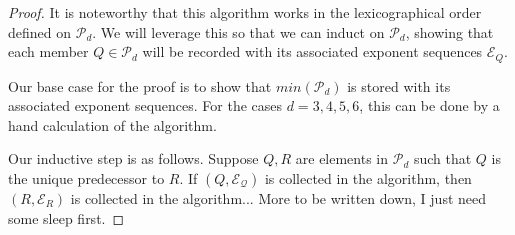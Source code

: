 \documentclass[../paper.tex]{subfiles}
\begin{document}
\noindent{}

\noindent{}

\begin{proof}
It is noteworthy that this algorithm works in the lexicographical
order defined on $\mathcal{P}_d$. We will leverage this so that we
can induct on $\mathcal{P}_d$, showing that each member $Q \in 
\mathcal{P}_d$ will be recorded with its associated exponent 
sequences $\mathcal{E}_Q$.

Our base case for the proof is to show that $min(\mathcal{P}_d)$
is stored with its associated exponent sequences. For the cases $d
= 3, 4, 5, 6$, this can be done by a hand calculation of the
algorithm.

Our inductive step is as follows. Suppose $Q, R$ are elements in 
$\mathcal{P}_d$ such that $Q$ is the unique predecessor to $R$. If
$(Q, \mathcal{E_Q})$ is collected in the algorithm, then $(R,
\mathcal{E}_R)$ is collected in the algorithm... More to be
written down, I just need some sleep first.
\end{proof}
\end{document}

